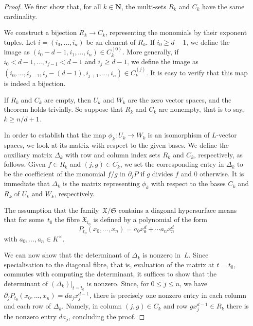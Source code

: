 \documentclass[a4paper,11pt]{article}
\numberwithin{equation}{section}
\newcommand{\NN}{\mathbf{N}} %
\renewcommand{\to}{\rightarrow}        %
\theoremstyle{definition}
\begin{document}
\begin{proof}
We first show that, for all $k \in \NN$, the multi-sets $R_k$ and $C_k$ 
have the same cardinality.

We construct a bijection $R_k \to C_k$, representing the 
monomials by their exponent tuples.  Let $i = (i_0, \dotsc, i_n)$ be an
element of $R_k$.  If $i_0 \geq d-1$, we define the image as
$(i_0-d-1, i_1, \dotsc, i_n) \in C_k^{(0)}$.  More generally, if 
$i_0 < d-1, \dotsc, i_{j-1} < d-1$ and $i_j \geq d-1$, we define the image as 
$(i_0, \dotsc, i_{j-1}, i_j-(d-1), i_{j+1}, \dotsc, i_n) \in C_k^{(j)}$.  
It is easy to verify that this map is indeed a bijection.

If $R_k$ and $C_k$ are empty, then $U_k$ and $W_k$ are the zero vector spaces, and
the theorem holds trivially. So suppose that $R_k$ and $C_k$ are nonempty, that is to
say, $k \geq n/d + 1$.

In order to establish that the map $\phi_k \colon U_k \to W_k$ is an 
isomorphism of $L$-vector spaces, we look at its matrix with respect to 
the given bases. We define the auxiliary matrix $\Delta_k$ with 
row and column index sets $R_k$ and $C_k$, respectively, as follows.  
Given $f \in R_k$ and $(j,g) \in C_k$, we set the corresponding entry in 
$\Delta_k$ to be the coefficient of the monomial $f/g$ in $\partial_j P$ if 
$g$ divides $f$ and $0$ otherwise.  It is immediate that $\Delta_k$ is the 
matrix representing $\phi_k$ with respect to the bases $C_k$ and $R_k$ of 
$U_k$ and $W_k$, respectively.

The assumption that the family~$\mathfrak{X}/\mathfrak{S}$ contains a diagonal 
hypersurface means that for some~$t_0$ the fibre $\mathfrak{X}_{t_0}$ is 
defined by a polynomial of the form 
\begin{equation}
P_{t_0}(x_0, \dotsc, x_n) = a_0 x_0^d + \dotsb a_n x_n^d
\end{equation}
with $a_0, \dotsc, a_n \in K^{\times}$.

We can now show that the determinant of $\Delta_k$ is nonzero in~$L$.  Since 
specialisation to the diagonal fibre, that is, evaluation of the matrix at 
$t = t_0$, commutes with computing the determinant, it suffices to show that 
the determinant of $(\Delta_k) \big |_{t=t_0}$ is nonzero.  Since, for 
$0 \leq j \leq n$, we have $\partial_j P_{t_0} (x_0, \dotsc, x_n) = d a_j x_j^{d-1}$, 
there is precisely one nonzero entry in each column and each row of $\Delta_k$.  
Namely, in column $(j, g) \in C_k$ and row $g x_j^{d-1} \in R_k$ there is the 
nonzero entry $d a_j$, concluding the proof.
\end{proof}
\end{document}

